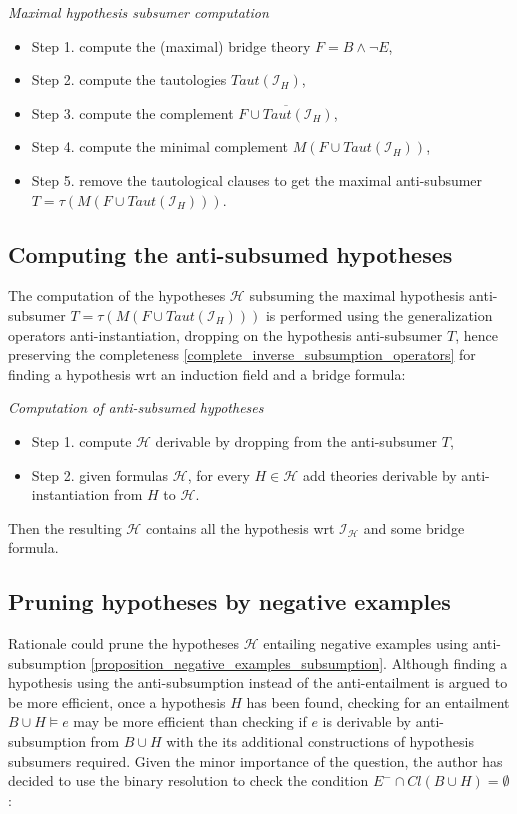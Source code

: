 \begin{algorithm}\label{maximal_hypothesis_antisubsumer_algorithm}\emph{Maximal hypothesis subsumer computation}
\begin{itemize}
\item Step 1. compute the (maximal) bridge theory $F=B \land \neg E$,
\item Step 2. compute the tautologies $Taut(\mathcal{I}_H)$,
\item Step 3. compute the complement $\overline{F \cup Taut(\mathcal{I}_H)}$,
\item Step 4. compute the minimal complement $M(F \cup Taut(\mathcal{I}_H))$,
\item Step 5. remove the tautological clauses to get the maximal anti-subsumer $T=\tau(M(F \cup Taut(\mathcal{I}_H)))$.
\end{itemize}
\end{algorithm}

\subsection{Computing the anti-subsumed hypotheses}
The computation of the hypotheses $\mathcal{H}$ subsuming the maximal hypothesis  anti-subsumer $T=\tau(M(F \cup Taut(\mathcal{I}_H)))$ is performed using the generalization operators\cite{yamamoto2008towards} anti-instantiation, dropping on the hypothesis anti-subsumer $T$, hence preserving the completeness \ref{complete_inverse_subsumption_operators} for finding a hypothesis wrt an induction field and a bridge formula:

\begin{algorithm}\emph{Computation of anti-subsumed hypotheses}
\begin{itemize}
\item Step 1. compute $\mathcal{H}$ derivable by dropping from the anti-subsumer $T$,
\item Step 2. given formulas $\mathcal{H}$, for every $H \in \mathcal{H}$ add theories derivable by anti-instantiation from $H$ to $\mathcal{H}$.
\end{itemize}
\end{algorithm}

Then the resulting $\mathcal{H}$ contains all the hypothesis wrt $\mathcal{I_H}$ and some bridge formula.

\subsection{Pruning hypotheses by negative examples}
Rationale could prune the hypotheses $\mathcal{H}$ entailing negative examples using anti-subsumption \ref{proposition_negative_examples_subsumption}.
Although finding a hypothesis using the anti-subsumption instead of the anti-entailment is argued to be more efficient\cite{yamamoto2012inverse}, once a hypothesis $H$ has been found, checking for an entailment $B \cup H \models e$ may be more efficient than checking if $e$ is derivable by anti-subsumption from $B \cup H$ with the its additional constructions of hypothesis subsumers required. Given the minor importance of the question, the author has decided to use the binary resolution to check the condition $E^- \cap Cl(B \cup H)=\emptyset$:

